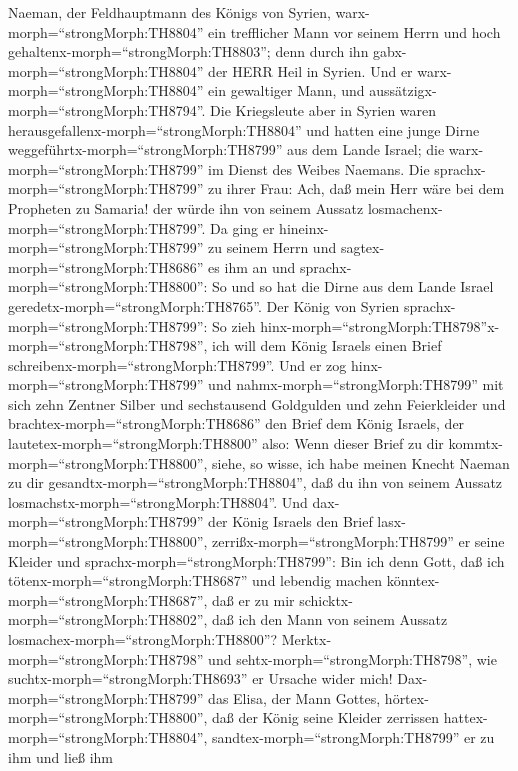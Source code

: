  Naeman, der Feldhauptmann des Königs von Syrien,
warx-morph=``strongMorph:TH8804'' ein trefflicher Mann vor seinem Herrn
und hoch gehaltenx-morph=``strongMorph:TH8803''; denn durch ihn
gabx-morph=``strongMorph:TH8804'' der HERR Heil in Syrien. Und er
warx-morph=``strongMorph:TH8804'' ein gewaltiger Mann, und
aussätzigx-morph=``strongMorph:TH8794''.  Die Kriegsleute
aber in Syrien waren herausgefallenx-morph=``strongMorph:TH8804'' und
hatten eine junge Dirne weggeführtx-morph=``strongMorph:TH8799'' aus dem
Lande Israel; die warx-morph=``strongMorph:TH8799'' im Dienst des Weibes
Naemans.  Die sprachx-morph=``strongMorph:TH8799'' zu ihrer
Frau: Ach, daß mein Herr wäre bei dem Propheten zu Samaria! der würde
ihn von seinem Aussatz losmachenx-morph=``strongMorph:TH8799''.
 Da ging er hineinx-morph=``strongMorph:TH8799'' zu seinem
Herrn und sagtex-morph=``strongMorph:TH8686'' es ihm an und
sprachx-morph=``strongMorph:TH8800'': So und so hat die Dirne aus dem
Lande Israel geredetx-morph=``strongMorph:TH8765''.  Der
König von Syrien sprachx-morph=``strongMorph:TH8799'': So zieh
hinx-morph=``strongMorph:TH8798''x-morph=``strongMorph:TH8798'', ich
will dem König Israels einen Brief
schreibenx-morph=``strongMorph:TH8799''. Und er zog
hinx-morph=``strongMorph:TH8799'' und nahmx-morph=``strongMorph:TH8799''
mit sich zehn Zentner Silber und sechstausend Goldgulden und zehn
Feierkleider  und brachtex-morph=``strongMorph:TH8686'' den
Brief dem König Israels, der lautetex-morph=``strongMorph:TH8800'' also:
Wenn dieser Brief zu dir kommtx-morph=``strongMorph:TH8800'', siehe, so
wisse, ich habe meinen Knecht Naeman zu dir
gesandtx-morph=``strongMorph:TH8804'', daß du ihn von seinem Aussatz
losmachstx-morph=``strongMorph:TH8804''.  Und
dax-morph=``strongMorph:TH8799'' der König Israels den Brief
lasx-morph=``strongMorph:TH8800'', zerrißx-morph=``strongMorph:TH8799''
er seine Kleider und sprachx-morph=``strongMorph:TH8799'': Bin ich denn
Gott, daß ich tötenx-morph=``strongMorph:TH8687'' und lebendig machen
könntex-morph=``strongMorph:TH8687'', daß er zu mir
schicktx-morph=``strongMorph:TH8802'', daß ich den Mann von seinem
Aussatz losmachex-morph=``strongMorph:TH8800''?
Merktx-morph=``strongMorph:TH8798'' und
sehtx-morph=``strongMorph:TH8798'', wie
suchtx-morph=``strongMorph:TH8693'' er Ursache wider mich! 
Dax-morph=``strongMorph:TH8799'' das Elisa, der Mann Gottes,
hörtex-morph=``strongMorph:TH8800'', daß der König seine Kleider
zerrissen hattex-morph=``strongMorph:TH8804'',
sandtex-morph=``strongMorph:TH8799'' er zu ihm und ließ ihm

